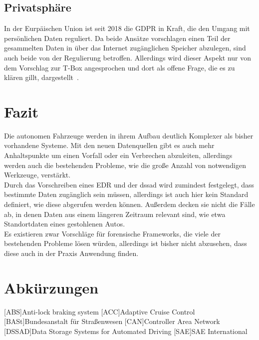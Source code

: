 \documentclass[conference,compsoc,final,a4paper]{IEEEtran}
\begin{document}
\subsection{Privatsphäre}
In der Eurpäischen Union ist seit 2018 die \ac{GDPR} in Kraft, die den Umgang mit persönlichen Daten
reguliert. Da beide Ansätze vorschlagen einen Teil der gesammelten Daten in über das Internet zugänglichen Speicher
abzulegen, sind auch beide von der Regulierung betroffen. Allerdings wird dieser Aspekt nur von dem Vorschlag zur T-Box angesprochen und dort als
offene Frage, die es zu klären gillt, dargestellt~\cite{Lee_2019}.

\section{Fazit}

Die autonomen Fahrzeuge werden in ihrem Aufbau deutlich Komplexer als bisher vorhandene Systeme.
Mit den neuen Datenquellen gibt es auch mehr Anhaltspunkte um einen Vorfall oder ein Verbrechen
abzuleiten, allerdings werden auch die bestehenden Probleme, wie die große Anzahl von notwendigen Werkzeuge, verstärkt.\\
Durch das Vorschreiben eines \ac{EDR} und der \ac{dssad} wird zumindest festgelegt, dass bestimmte Daten zugänglich sein müssen,
allerdings ist auch hier kein Standard definiert, wie diese abgerufen werden können.
Außerdem decken sie nicht die Fälle ab, in denen Daten aus einem längeren Zeitraum relevant sind, wie etwa Standortdaten eines gestohlenen Autos.\\
Es existieren zwar Vorschläge für forensische Frameworks, die viele der bestehenden Probleme lösen würden, allerdings ist bisher nicht abzusehen, dass diese auch in der Praxis Anwendung finden.

\section*{Abkürzungen}

\begin{acronym}[NHTSA]
  [ABS]{Anti-lock braking system}
  [ACC]{Adaptive Cruise Control}
  [BASt]{Bundesanstalt für Straßenwesen}
  [CAN]{Controller Area Network}
  [DSSAD]{Data Storage Systems for Automated Driving}
  [SAE]{SAE International}
\end{acronym}

\printbibliography
\end{document}
